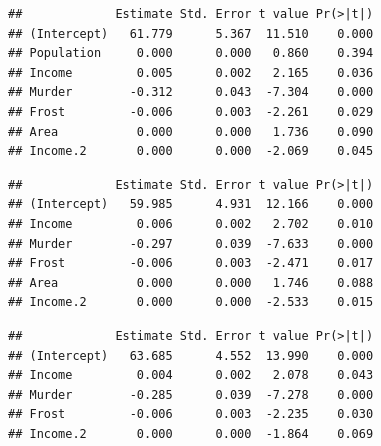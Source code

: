 \documentclass[]{book}
\newenvironment{Shaded}{\begin{snugshade}}{\end{snugshade}}
\newcommand{\KeywordTok}[1]{\textcolor[rgb]{0.13,0.29,0.53}{\textbf{{#1}}}}
\newcommand{\DataTypeTok}[1]{\textcolor[rgb]{0.13,0.29,0.53}{{#1}}}
\newcommand{\DecValTok}[1]{\textcolor[rgb]{0.00,0.00,0.81}{{#1}}}
\newcommand{\StringTok}[1]{\textcolor[rgb]{0.31,0.60,0.02}{{#1}}}
\newcommand{\CommentTok}[1]{\textcolor[rgb]{0.56,0.35,0.01}{\textit{{#1}}}}
\newcommand{\NormalTok}[1]{{#1}}
\theoremstyle{definition}
\theoremstyle{definition}
\theoremstyle{remark}
\begin{document}
\begin{verbatim}
##             Estimate Std. Error t value Pr(>|t|)
## (Intercept)   61.779      5.367  11.510    0.000
## Population     0.000      0.000   0.860    0.394
## Income         0.005      0.002   2.165    0.036
## Murder        -0.312      0.043  -7.304    0.000
## Frost         -0.006      0.003  -2.261    0.029
## Area           0.000      0.000   1.736    0.090
## Income.2       0.000      0.000  -2.069    0.045
\end{verbatim}

\begin{Shaded}
\end{Shaded}

\begin{verbatim}
##             Estimate Std. Error t value Pr(>|t|)
## (Intercept)   59.985      4.931  12.166    0.000
## Income         0.006      0.002   2.702    0.010
## Murder        -0.297      0.039  -7.633    0.000
## Frost         -0.006      0.003  -2.471    0.017
## Area           0.000      0.000   1.746    0.088
## Income.2       0.000      0.000  -2.533    0.015
\end{verbatim}

\begin{Shaded}
\end{Shaded}

\begin{verbatim}
##             Estimate Std. Error t value Pr(>|t|)
## (Intercept)   63.685      4.552  13.990    0.000
## Income         0.004      0.002   2.078    0.043
## Murder        -0.285      0.039  -7.278    0.000
## Frost         -0.006      0.003  -2.235    0.030
## Income.2       0.000      0.000  -1.864    0.069
\end{verbatim}
\end{document}
